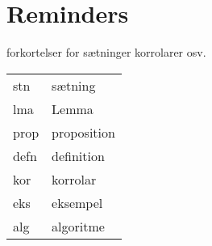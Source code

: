 \chapter{Reminders}

forkortelser for sætninger korrolarer osv.
\begin{table}[h]
\begin{tabular}{|l|l|}
stn & sætning \\
lma & Lemma \\
prop & proposition \\
defn & definition \\
kor & korrolar \\
eks & eksempel \\
alg & algoritme
\end{tabular}
\end{table}
